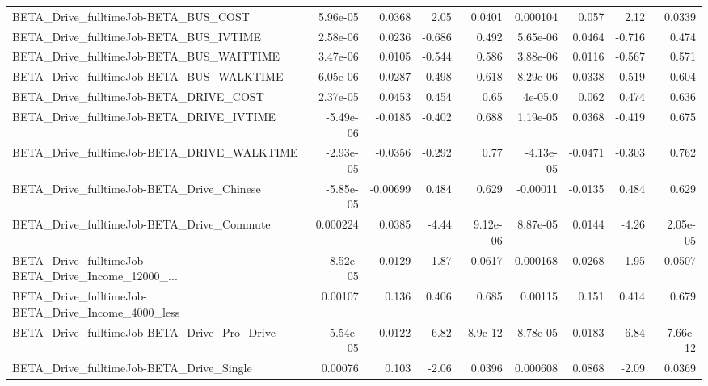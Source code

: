 \begin{tabular}{lrrrrrrrr}
BETA\_Drive\_fulltimeJob-BETA\_BUS\_COST               &    5.96e-05 &       0.0368 &      2.05 &   0.0401 &   0.000104 &       0.057 &         2.12 &        0.0339 \\
BETA\_Drive\_fulltimeJob-BETA\_BUS\_IVTIME             &    2.58e-06 &       0.0236 &    -0.686 &    0.492 &   5.65e-06 &      0.0464 &       -0.716 &         0.474 \\
BETA\_Drive\_fulltimeJob-BETA\_BUS\_WAITTIME           &    3.47e-06 &       0.0105 &    -0.544 &    0.586 &   3.88e-06 &      0.0116 &       -0.567 &         0.571 \\
BETA\_Drive\_fulltimeJob-BETA\_BUS\_WALKTIME           &    6.05e-06 &       0.0287 &    -0.498 &    0.618 &   8.29e-06 &      0.0338 &       -0.519 &         0.604 \\
BETA\_Drive\_fulltimeJob-BETA\_DRIVE\_COST             &    2.37e-05 &       0.0453 &     0.454 &     0.65 &    4e-05.0 &       0.062 &        0.474 &         0.636 \\
BETA\_Drive\_fulltimeJob-BETA\_DRIVE\_IVTIME           &   -5.49e-06 &      -0.0185 &    -0.402 &    0.688 &   1.19e-05 &      0.0368 &       -0.419 &         0.675 \\
BETA\_Drive\_fulltimeJob-BETA\_DRIVE\_WALKTIME         &   -2.93e-05 &      -0.0356 &    -0.292 &     0.77 &  -4.13e-05 &     -0.0471 &       -0.303 &         0.762 \\
BETA\_Drive\_fulltimeJob-BETA\_Drive\_Chinese          &   -5.85e-05 &     -0.00699 &     0.484 &    0.629 &   -0.00011 &     -0.0135 &        0.484 &         0.629 \\
BETA\_Drive\_fulltimeJob-BETA\_Drive\_Commute          &    0.000224 &       0.0385 &     -4.44 & 9.12e-06 &   8.87e-05 &      0.0144 &        -4.26 &      2.05e-05 \\
BETA\_Drive\_fulltimeJob-BETA\_Drive\_Income\_12000\_... &   -8.52e-05 &      -0.0129 &     -1.87 &   0.0617 &   0.000168 &      0.0268 &        -1.95 &        0.0507 \\
BETA\_Drive\_fulltimeJob-BETA\_Drive\_Income\_4000\_less &     0.00107 &        0.136 &     0.406 &    0.685 &    0.00115 &       0.151 &        0.414 &         0.679 \\
BETA\_Drive\_fulltimeJob-BETA\_Drive\_Pro\_Drive        &   -5.54e-05 &      -0.0122 &     -6.82 &  8.9e-12 &   8.78e-05 &      0.0183 &        -6.84 &      7.66e-12 \\
BETA\_Drive\_fulltimeJob-BETA\_Drive\_Single           &     0.00076 &        0.103 &     -2.06 &   0.0396 &   0.000608 &      0.0868 &        -2.09 &        0.0369 \\

\end{tabular}
